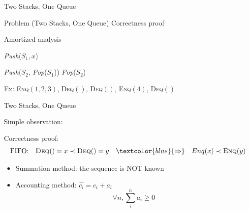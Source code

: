 \documentclass{beamer}
\begin{document}
\begin{frame}{Two Stacks, One Queue}

  \begin{exampleblock}{Problem (Two Stacks, One Queue)}
    Correctness proof

    Amortized analysis
  \end{exampleblock}

  \begin{algorithm}[H]
    \caption{Simulating a queue using two stacks $S_1, S_2$.}
    \begin{algorithmic}[]
		\State \textsl{Push}($S_1, x$)
      \EndProcedure

	  \Statex

            \State \textsl{Push}($S_2$, \textsl{Pop}($S_1$))
          \EndWhile
        \EndIf
        \textsl{Pop}($S_2$)
      \EndProcedure
    \end{algorithmic}
  \end{algorithm}

  Ex: \textsc{Enq}$(1,2,3)$, \textsc{Deq}$()$, \textsc{Deq}$()$,
  \textsc{Enq}$(4)$, \textsc{Deq}$()$
\end{frame}
\begin{frame}{Two Stacks, One Queue}
  \begin{center}
    Simple observation: 
  \end{center}

  \begin{block}{Correctness proof:}
    \[
      \textrm{FIFO:} \quad \textsc{Deq}() = x \prec \textsc{Deq}() = y
      \quad \textcolor{blue}{\Rightarrow} \quad Enq(x) \prec \textsc{Enq}(y)
    \]
  \end{block}

  \begin{itemize}
    \item Summation method: the sequence is \uppercase{not} known
    \item Accounting method: $\hat{c_i} = c_i + a_i$
    \[ \forall n, \sum_{i}^{n} a_i \geq 0 \]
  \end{itemize}
\end{frame}
\end{document}
